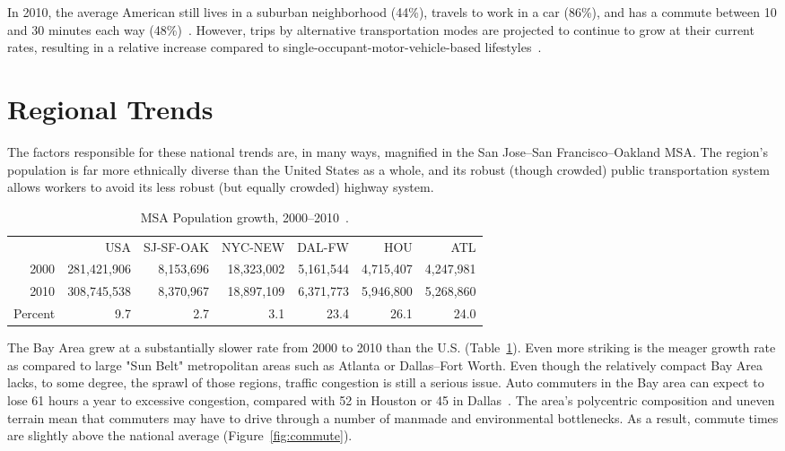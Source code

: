 \documentclass[12pt]{article}
\begin{document}
In 2010, the average American still lives in a suburban neighborhood (44\%), travels to work in a car (86\%), and has a commute between 10 and 30 minutes each way (48\%)~\citep{pisarski2006commuting,DOT2009NHTS}.  However, trips by alternative transportation modes are projected to continue to grow at their current rates, resulting in a relative increase compared to single-occupant-motor-vehicle-based lifestyles~\citep{schrank2012urban}. 


\section{Regional Trends}
The factors responsible for these national trends are, in many ways, magnified in the San Jose--San Francisco--Oakland MSA. The region's population is far more ethnically diverse than the United States as a whole, and its robust (though crowded) public transportation system allows workers to avoid its less robust (but equally crowded) highway system. 
\begin{table}
\begin{center}
 \begin{tabular}{rrrrrrr}
       & USA   & SJ-SF-OAK & NYC-NEW & DAL-FW & HOU  & ATL \\
\cline{2-7}
 2000  & 281,421,906 & 8,153,696 & 18,323,002 & 5,161,544 & 4,715,407 & 4,247,981 \\
 2010  & 308,745,538 & 8,370,967 & 18,897,109 & 6,371,773 & 5,946,800 & 5,268,860 \\
 Percent & 9.7   & 2.7  & 3.1   & 23.4  & 26.1  & 24.0 \\
 \end{tabular}%
 \caption{MSA Population growth, 2000--2010~\citep{USACENSUS}.}
 \label{table:popchange}
\end{center}
\end{table}

The Bay Area grew at a substantially slower rate from 2000 to 2010 than the U.S. (Table~\ref{table:popchange}). Even more striking is the meager growth rate as compared to large "Sun Belt" metropolitan areas such as Atlanta or Dallas--Fort Worth. Even though the relatively compact Bay Area lacks, to some degree, the sprawl of those regions, traffic congestion is still a serious issue. Auto commuters in the Bay area can expect to lose 61 hours a year to excessive congestion, compared with 52 in Houston or 45 in Dallas~\citep{schrank2012urban}. The area's polycentric composition and uneven terrain mean that commuters may have to drive through a number of manmade and environmental bottlenecks. As a result, commute times are slightly above the national average (Figure~\ref{fig:commute}).
\end{document}
